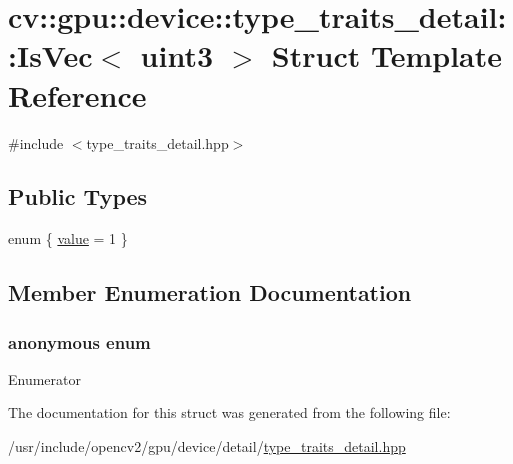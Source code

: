 \hypertarget{structcv_1_1gpu_1_1device_1_1type__traits__detail_1_1IsVec_3_01uint3_01_4}{\section{cv\-:\-:gpu\-:\-:device\-:\-:type\-\_\-traits\-\_\-detail\-:\-:Is\-Vec$<$ uint3 $>$ Struct Template Reference}
\label{structcv_1_1gpu_1_1device_1_1type__traits__detail_1_1IsVec_3_01uint3_01_4}
}


{\ttfamily \#include $<$type\-\_\-traits\-\_\-detail.\-hpp$>$}

\subsection*{Public Types}
\begin{DoxyCompactItemize}
\item 
enum \{ \hyperlink{structcv_1_1gpu_1_1device_1_1type__traits__detail_1_1IsVec_3_01uint3_01_4_a03ba26454e0a1117eabe3d06fe811b6ea7d48be0e4f8acf5ac884148a0be49b61}{value} = 1
 \}
\end{DoxyCompactItemize}


\subsection{Member Enumeration Documentation}
\hypertarget{structcv_1_1gpu_1_1device_1_1type__traits__detail_1_1IsVec_3_01uint3_01_4_a03ba26454e0a1117eabe3d06fe811b6e}{\subsubsection[{anonymous enum}]{\setlength{\rightskip}{0pt plus 5cm}anonymous enum}}\label{structcv_1_1gpu_1_1device_1_1type__traits__detail_1_1IsVec_3_01uint3_01_4_a03ba26454e0a1117eabe3d06fe811b6e}
\begin{Desc}
\item[Enumerator]\par
\begin{description}
\item[{\em 
\hypertarget{structcv_1_1gpu_1_1device_1_1type__traits__detail_1_1IsVec_3_01uint3_01_4_a03ba26454e0a1117eabe3d06fe811b6ea7d48be0e4f8acf5ac884148a0be49b61}{value}\label{structcv_1_1gpu_1_1device_1_1type__traits__detail_1_1IsVec_3_01uint3_01_4_a03ba26454e0a1117eabe3d06fe811b6ea7d48be0e4f8acf5ac884148a0be49b61}
}]\end{description}
\end{Desc}


The documentation for this struct was generated from the following file\-:\begin{DoxyCompactItemize}
\item 
/usr/include/opencv2/gpu/device/detail/\hyperlink{type__traits__detail_8hpp}{type\-\_\-traits\-\_\-detail.\-hpp}\end{DoxyCompactItemize}
